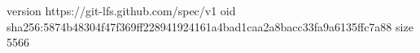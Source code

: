 version https://git-lfs.github.com/spec/v1
oid sha256:5874b48304f47f369ff228941924161a4bad1caa2a8bacc33fa9a6135ffc7a88
size 5566
